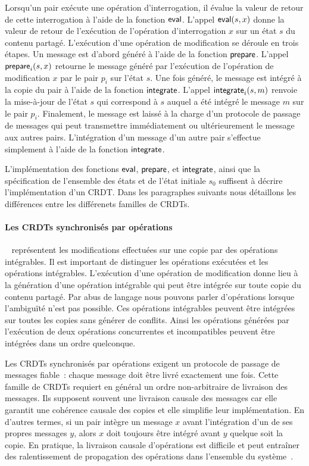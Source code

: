 Lorsqu'un pair exécute une opération d'interrogation, il évalue la valeur de retour de cette interrogation à l'aide
de la fonction $\operatorname{\mathsf{eval}}$.
L'appel $\operatorname{\mathsf{eval}}(s, x)$ donne la valeur de retour de l'exécution de l'opération d'interrogation $x$ sur un état $s$ du contenu partagé.
L'exécution d'une opération de modification se déroule en trois étapes.
Un message est d'abord généré à l'aide de la fonction $\operatorname{\mathsf{prepare}}$.
L'appel $\operatorname{\mathsf{prepare}}_i(s, x)$ retourne le message généré par l'exécution de l'opération de modification $x$ par le pair $p_i$ sur l'état $s$.
Une fois généré, le message est intégré à la copie du pair à l'aide de la fonction $\operatorname{\mathsf{integrate}}$.
L'appel $\operatorname{\mathsf{integrate}}_i(s, m)$ renvoie la mise-à-jour de l'état $s$ qui correspond à $s$ auquel a été intégré le message $m$ sur le pair $p_i$.
Finalement, le message est laissé à la charge d'un protocole de passage de messages qui peut transmettre immédiatement ou ultérieurement le message aux autres pairs.
L'intégration d'un message d'un autre pair s'effectue simplement à l'aide de la fonction $\operatorname{\mathsf{integrate}}$.

L'implémentation des fonctions $\operatorname{\mathsf{eval}}$, $\operatorname{\mathsf{prepare}}$, et $\operatorname{\mathsf{integrate}}$, ainsi que la spécification de l'ensemble des états et de l'état initiale $s_0$ suffisent à décrire l'implémentation d'un \ac{CRDT}.
Dans les paragraphes suivants nous détaillons les différences entre les différenets familles de \acp{CRDT}.

\paragraph{Les \acp{CRDT} synchronisés par opérations}~\autocite{baquero_2014_pure-op-crdt,baquero_2018_pure-op-crdt} représentent les modifications effectuées sur une copie par des opérations intégrables.
Il est important de distinguer les opérations exécutées et les opérations intégrables.
L'exécution d'une opération de modification donne lieu à la génération d'une opération intégrable qui peut être intégrée sur toute copie du contenu partagé.
Par abus de langage nous pouvons parler d'opérations lorsque l'ambiguïté n'est pas possible.
Ces opérations intégrables peuvent être intégrées sur toutes les copies sans générer de conflits.
Ainsi les opérations générées par l'exécution de deux opérations concurrentes et incompatibles peuvent être intégrées dans un ordre quelconque.

Les \acp{CRDT} synchronisés par opérations exigent un protocole de passage de messages fiable~: chaque message doit être livré exactement une fois.
Cette famille de \acp{CRDT} requiert en général un ordre non-arbitraire de livraison des messages.
Ils supposent souvent une livraison causale des messages car elle garantit une cohérence causale des copies et elle simplifie leur implémentation.
En d'autres termes, si un pair intègre un message $x$ avant l'intégration d'un de ses propres messages $y$, alors $x$ doit toujours être intégré avant $y$ quelque soit la copie.
En pratique, la livraison causale d'opérations est difficile et peut entraîner des ralentissement de propagation des opérations dans l'ensemble du système~\autocite{alvisi_2017_writes-dirty-secret}.

